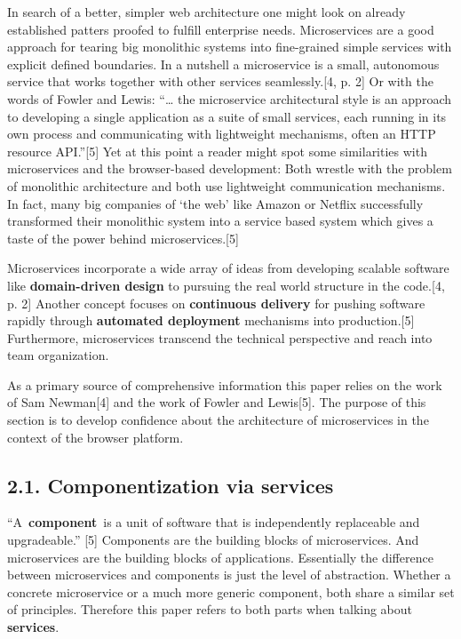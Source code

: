 \documentclass[]{article}
\begin{document}
In search of a better, simpler web architecture one might look on
already established patters proofed to fulfill enterprise needs.
Microservices are a good approach for tearing big monolithic systems
into fine-grained simple services with explicit defined boundaries. In a
nutshell a microservice is a small, autonomous service that works
together with other services seamlessly.{[}4, p. 2{]} Or with the words
of Fowler and Lewis: ``\ldots{} the microservice architectural style is
an approach to developing a single application as a suite of small
services, each running in its own process and communicating with
lightweight mechanisms, often an HTTP resource API.''{[}5{]} Yet at this
point a reader might spot some similarities with microservices and the
browser-based development: Both wrestle with the problem of monolithic
architecture and both use lightweight communication mechanisms. In fact,
many big companies of `the web' like Amazon or Netflix successfully
transformed their monolithic system into a service based system which
gives a taste of the power behind microservices.{[}5{]}

Microservices incorporate a wide array of ideas from developing scalable
software like \textbf{domain-driven design} to pursuing the real world
structure in the code.{[}4, p. 2{]} Another concept focuses on
\textbf{continuous delivery} for pushing software rapidly through
\textbf{automated deployment} mechanisms into production.{[}5{]}
Furthermore, microservices transcend the technical perspective and reach
into team organization.

As a primary source of comprehensive information this paper relies on
the work of Sam Newman{[}4{]} and the work of Fowler and Lewis{[}5{]}.
The purpose of this section is to develop confidence about the
architecture of microservices in the context of the browser platform.

\subsection{2.1. Componentization via
services}\label{componentization-via-services}

``A~\textbf{component}~is a unit of software that is independently
replaceable and upgradeable.'' {[}5{]} Components are the building
blocks of microservices. And microservices are the building blocks of
applications. Essentially the difference between microservices and
components is just the level of abstraction. Whether a concrete
microservice or a much more generic component, both share a similar set
of principles. Therefore this paper refers to both parts when talking
about \textbf{services}.
\end{document}
